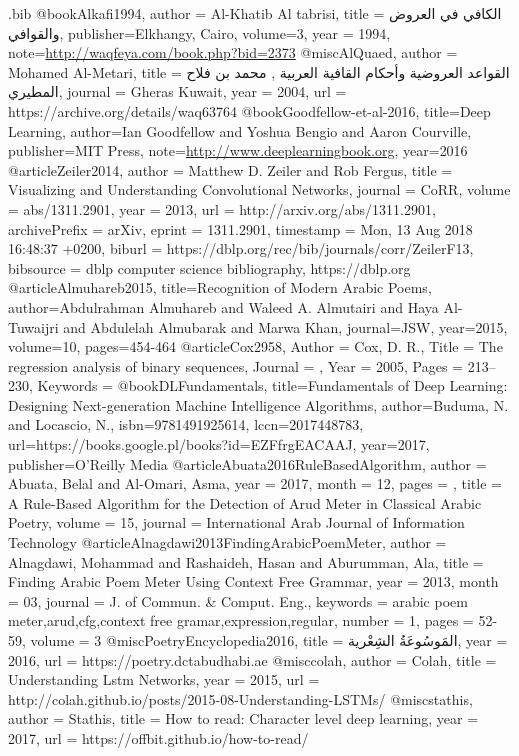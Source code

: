 \usepackage{filecontents}
\begin{filecontents}{\jobname.bib}
@book{Alkafi1994,
  author =	 {Al-Khatib Al tabrisi},
  title =	 {{\textarabic{الكافي في العروض والقوافي}}},
  publisher={Elkhangy, Cairo},
  volume={3},
  year = {1994},
  note={\url{http://waqfeya.com/book.php?bid=2373}}
}
@misc{AlQuaed,
  author =	 {Mohamed Al-Metari},
  title =	 {{\textarabic{القواعد العروضية وأحكام القافية العربية , محمد بن فلاح المطيري}}},
  journal = {Gheras Kuwait},
  year = {2004},
  url = {https://archive.org/details/waq63764}
}
@book{Goodfellow-et-al-2016,
    title={Deep Learning},
    author={Ian Goodfellow and Yoshua Bengio and Aaron Courville},
    publisher={MIT Press},
    note={\url{http://www.deeplearningbook.org}},
    year={2016}
}
@article{Zeiler2014,
  author    = {Matthew D. Zeiler and
               Rob Fergus},
  title     = {Visualizing and Understanding Convolutional Networks},
  journal   = {CoRR},
  volume    = {abs/1311.2901},
  year      = {2013},
  url       = {http://arxiv.org/abs/1311.2901},
  archivePrefix = {arXiv},
  eprint    = {1311.2901},
  timestamp = {Mon, 13 Aug 2018 16:48:37 +0200},
  biburl    = {https://dblp.org/rec/bib/journals/corr/ZeilerF13},
  bibsource = {dblp computer science bibliography, https://dblp.org}
}
@article{Almuhareb2015,
  title={Recognition of Modern Arabic Poems},
  author={Abdulrahman Almuhareb and Waleed A. Almutairi and Haya Al-Tuwaijri and Abdulelah Almubarak and Marwa Khan},
  journal={JSW},
  year={2015},
  volume={10},
  pages={454-464}
}
@article{Cox2958,
  Author = {Cox, D. R.},
  Title = {The regression analysis of binary sequences},
  Journal = {},
  Year = {2005},
  Pages = {213--230},
  Keywords = {}
}
@book{DLFundamentals,
  title={Fundamentals of Deep Learning: Designing Next-generation Machine Intelligence Algorithms},
  author={Buduma, N. and Locascio, N.},
  isbn={9781491925614},
  lccn={2017448783},
  url={https://books.google.pl/books?id=EZFfrgEACAAJ},
  year={2017},
  publisher={O'Reilly Media}
}
@article{Abuata2016RuleBasedAlgorithm,
author = {Abuata, Belal and Al-Omari, Asma},
year = {2017},
month = {12},
pages = {},
title = {A Rule-Based Algorithm for the Detection of Arud Meter in Classical Arabic Poetry},
volume = {15},
journal = {International Arab Journal of Information Technology}
}
@article{Alnagdawi2013FindingArabicPoemMeter,
author = {Alnagdawi, Mohammad and Rashaideh, Hasan and Aburumman, Ala},
title =	 {Finding Arabic Poem Meter Using Context Free Grammar},
year = {2013},
month = {03},
journal =	 {J. of Commun. {\&} Comput. Eng.},
keywords =	 {arabic poem meter,arud,cfg,context free gramar,expression,regular},
number =	 1,
pages =	 {52-59},
volume =	 3
}
@misc{PoetryEncyclopedia2016,
  title =	 {{\textarabic{المَوسُوعَةُ الشِعْرية}}},
  year =	 2016,
  url =		 {https://poetry.dctabudhabi.ae}
}
@misc{colah,
  author =	 {Colah},
  title =	 {{Understanding Lstm Networks}},
  year =	 2015,
  url =		 {http://colah.github.io/posts/2015-08-Understanding-LSTMs/}
}
@misc{stathis,
	author =	 {Stathis},
	title =	 {{How to read: Character level deep learning}},
	year =	 2017,
	url =		 {https://offbit.github.io/how-to-read/}
}


\end{filecontents}
